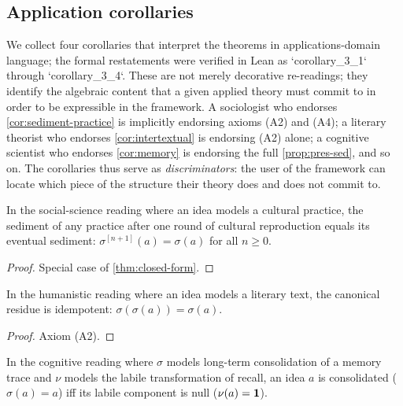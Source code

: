 \subsection*{Application corollaries}

We collect four corollaries that interpret the theorems in
applications-domain language; the formal restatements were verified
in Lean as `corollary\_3\_1` through `corollary\_3\_4`. These are
not merely decorative re-readings; they identify the algebraic
content that a given applied theory must commit to in order to be
expressible in the framework. A sociologist who endorses
\cref{cor:sediment-practice} is implicitly endorsing axioms (A2)
and (A4); a literary theorist who endorses
\cref{cor:intertextual} is endorsing (A2) alone; a cognitive
scientist who endorses \cref{cor:memory} is endorsing the full
\cref{prop:pres-sed}, and so on. The corollaries thus serve as
\emph{discriminators}: the user of the framework can locate which
piece of the structure their theory does and does not commit to.

\begin{corollary}\label{cor:sediment-practice}
In the social-science reading where an idea models a cultural
practice, the sediment of any practice after one round of cultural
reproduction equals its eventual sediment:
$\sigma^{[n+1]}(a)=\sigma(a)$ for all $n\geq 0$.
\end{corollary}

\begin{proof}
Special case of \cref{thm:closed-form}.
\end{proof}

\begin{corollary}\label{cor:intertextual}
In the humanistic reading where an idea models a literary text, the
canonical residue is idempotent: $\sigma(\sigma(a))=\sigma(a)$.
\end{corollary}

\begin{proof}
Axiom (A2).
\end{proof}

\begin{corollary}\label{cor:memory}
In the cognitive reading where $\sigma$ models long-term consolidation
of a memory trace and $\nu$ models the labile transformation of
recall, an idea $a$ is consolidated ($\sigma(a)=a$) iff its labile
component is null ($\nu(a)=\mathbf{1}$).
\end{corollary}


